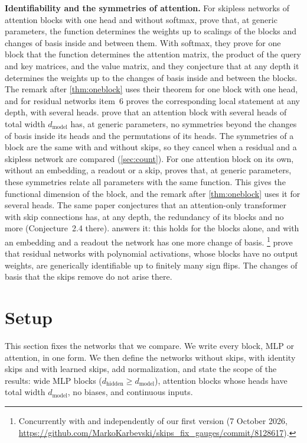 \documentclass[10pt]{article}
\theoremstyle{definition}
\theoremstyle{remark}
\newcommand{\dm}{d_{\mathrm{model}}}
\newcommand{\dhid}{d_{\mathrm{hidden}}}
\newcommand{\para}[1]{\smallskip\noindent\textbf{#1}\hspace{0.5em}}
\newif\ifanon \anonfalse
\begin{document}
\para{Identifiability and the symmetries of attention.} For skipless networks of attention blocks with one head and without softmax, \citet{henry2025lightning} prove that, at generic parameters, the function determines the weights up to scalings of the blocks and changes of basis inside and between them. With softmax, they prove for one block that the function determines the attention matrix, the product of the query and key matrices, and the value matrix, and they conjecture that at any depth it determines the weights up to the changes of basis inside and between the blocks. The remark after \cref{thm:oneblock} uses their theorem for one block with one head, and for residual networks item~6 proves the corresponding local statement at any depth, with several heads. \citet{wang2025gauge} prove that an attention block with several heads of total width $\dm$ has, at generic parameters, no symmetries beyond the changes of basis inside its heads and the permutations of its heads. The symmetries of a block are the same with and without skips, so they cancel when a residual and a skipless network are compared (\cref{sec:count}). For one attention block on its own, without an embedding, a readout or a skip, \citet[Theorem~2.1]{henry2026generic} proves that, at generic parameters, these symmetries relate all parameters with the same function. This gives the functional dimension of the block, and the remark after \cref{thm:oneblock} uses it for several heads. The same paper conjectures that an attention-only transformer with skip connections has, at any depth, the redundancy of its blocks and no more (Conjecture~2.4 there).  answers it: this holds for the blocks alone, and with an embedding and a readout the network has one more change of basis. \citet{dahlgren2026polynomial}\ifanon\footnote{Concurrent work.}\else\footnote{Concurrently with and independently of our first version (7 October 2026, \url{https://github.com/MarkoKarbevski/skips_fix_gauges/commit/8128617}).}\fi{} prove that residual networks with polynomial activations, whose blocks have no output weights, are generically identifiable up to finitely many sign flips. The changes of basis that the skips remove do not arise there.

\section{Setup}\label{sec:setup}
This section fixes the networks that we compare. We write every block, MLP or attention, in one form. We then define the networks without skips, with identity skips and with learned skips, add normalization, and state the scope of the results: wide MLP blocks ($\dhid \ge \dm$), attention blocks whose heads have total width $\dm$, no biases, and continuous inputs.
\end{document}
